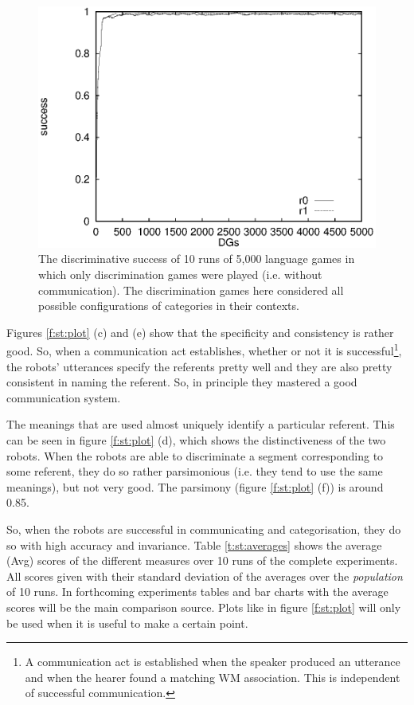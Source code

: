\begin{figure}[t]
\centerline{\includegraphics[width=12cm]{basic/dsall.eps}}
\caption{The discriminative success of 10 runs of 5,000 language games in which only discrimination games were played (i.e. without communication). The discrimination games here considered all possible configurations of categories in their contexts.}
\label{f:st:ds}
\end{figure}

Figures \ref{f:st:plot} (c) and (e) show that the specificity and consistency is rather good. So, when a communication act establishes, whether or not it is successful\footnote{A communication act is established when the speaker produced an utterance and when the hearer found a matching WM association. This is independent of successful communication.}, the robots' utterances specify the referents pretty well and they are also pretty consistent in naming the referent. So, in principle they mastered a good communication system.

The meanings that are used almost uniquely identify a particular referent. This can be seen in figure \ref{f:st:plot} (d), which shows the distinctiveness of the two robots. When the robots are able to discriminate a segment corresponding to some referent, they do so rather parsimonious (i.e. they tend to use the same meanings), but not very good. The parsimony (figure \ref{f:st:plot} (f)) is around 0.85. 

So, when the robots are successful in communicating and categorisation, they do so with high accuracy and invariance. Table \ref{t:st:averages} shows the average (Avg) scores of the different measures over 10 runs of the complete experiments. All scores given with their standard deviation of the averages over the {\em population} of 10 runs. In forthcoming experiments tables and bar charts with the average scores will be the main comparison source. Plots like in figure \ref{f:st:plot} will only be used when it is useful to make a certain point.

